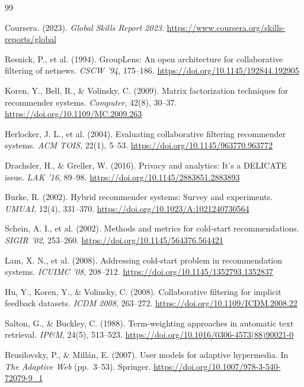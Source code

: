 \documentclass[12pt,a4paper]{report}
\begin{document}
{\small
\renewcommand{\bibsection}{}
\begin{thebibliography}{99}

Coursera. (2023). \textit{Global Skills Report 2023}. \url{https://www.coursera.org/skills-reports/global}

Resnick, P., et al. (1994). GroupLens: An open architecture for collaborative filtering of netnews. \textit{CSCW '94}, 175--186. \url{https://doi.org/10.1145/192844.192905}

Koren, Y., Bell, R., \& Volinsky, C. (2009). Matrix factorization techniques for recommender systems. \textit{Computer}, 42(8), 30--37. \url{https://doi.org/10.1109/MC.2009.263}

Herlocker, J. L., et al. (2004). Evaluating collaborative filtering recommender systems. \textit{ACM TOIS}, 22(1), 5--53. \url{https://doi.org/10.1145/963770.963772}

Drachsler, H., \& Greller, W. (2016). Privacy and analytics: It's a DELICATE issue. \textit{LAK '16}, 89--98. \url{https://doi.org/10.1145/2883851.2883893}

Burke, R. (2002). Hybrid recommender systems: Survey and experiments. \textit{UMUAI}, 12(4), 331--370. \url{https://doi.org/10.1023/A:1021240730564}

Schein, A. I., et al. (2002). Methods and metrics for cold-start recommendations. \textit{SIGIR '02}, 253--260. \url{https://doi.org/10.1145/564376.564421}

Lam, X. N., et al. (2008). Addressing cold-start problem in recommendation systems. \textit{ICUIMC '08}, 208--212. \url{https://doi.org/10.1145/1352793.1352837}

Hu, Y., Koren, Y., \& Volinsky, C. (2008). Collaborative filtering for implicit feedback datasets. \textit{ICDM 2008}, 263--272. \url{https://doi.org/10.1109/ICDM.2008.22}

Salton, G., \& Buckley, C. (1988). Term-weighting approaches in automatic text retrieval. \textit{IP\&M}, 24(5), 513--523. \url{https://doi.org/10.1016/0306-4573(88)90021-0}

Brusilovsky, P., \& Millán, E. (2007). User models for adaptive hypermedia. In \textit{The Adaptive Web} (pp.~3--53). Springer. \url{https://doi.org/10.1007/978-3-540-72079-9_1}


\end{thebibliography}}
\end{document}
